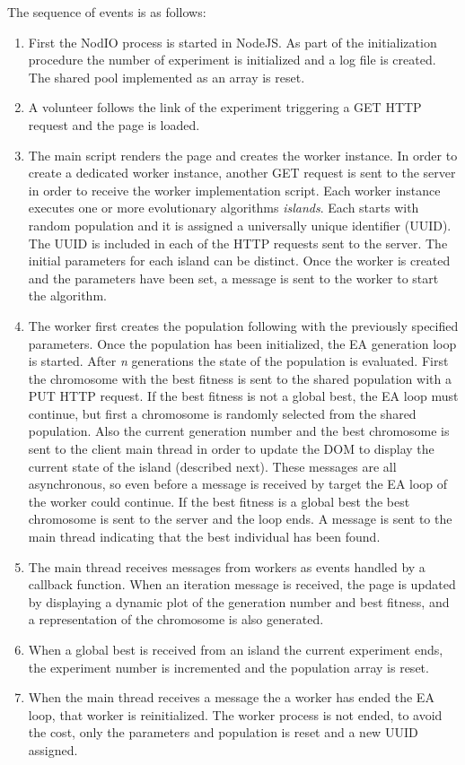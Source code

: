 \documentclass[journal,onecolumn]{IEEEtran}
\begin{document}
The sequence of events is as follows:
\begin{enumerate}
\item First the {\sf NodIO} process is started in NodeJS. As part of the
initialization procedure the number of experiment is initialized and a log
file is created. The shared pool implemented as an array is reset.
\item A volunteer follows the link of the experiment triggering a GET HTTP
request and the page is loaded.
\item The main script renders the page and creates the worker instance. In
order to create a dedicated worker instance, another GET request is sent to the
server in order to receive the worker implementation script.
Each worker instance executes one or more evolutionary algorithms
{\em islands}. Each starts with random population and it is assigned a
universally unique  identifier (UUID). The UUID is included in each of the HTTP
requests sent to the server.
The initial parameters for each island
can be distinct. Once the worker is created and the parameters have been set,
a message is sent to the worker to start the algorithm.
\item The worker first creates the population following with the previously
specified parameters. Once the population has been initialized, the EA
generation loop is started. After {\em n} generations the state of the population
is evaluated. First the chromosome with the best fitness is sent to the shared
population with a PUT HTTP request. If the best fitness is not a global best,
the EA loop must continue, but first a chromosome is randomly selected from
the shared population. Also the current generation number and the best
chromosome is sent to the client main thread in order to update the DOM to
display the current state of the island (described next). These messages are
all asynchronous, so even before a message is received by target the EA loop of
the worker could continue. If the best fitness is a global best the best
chromosome is sent to the server and the loop ends. A message is sent to the
main thread indicating that the best individual has been found.
\item The main thread receives messages from workers as events handled by
a callback function. When an iteration message is received, the page is
updated by displaying a dynamic plot of the generation number and best
fitness, and a representation of the chromosome is also generated.
\item When a global best is received from an island the current experiment
ends, the experiment number is incremented and the population array is reset.
\item When the main thread receives a message the a worker has ended the EA
loop, that worker is reinitialized. The worker process is not ended, to
avoid the cost, only the parameters and population is reset and a new UUID
assigned.
\end{enumerate}
\end{document}
